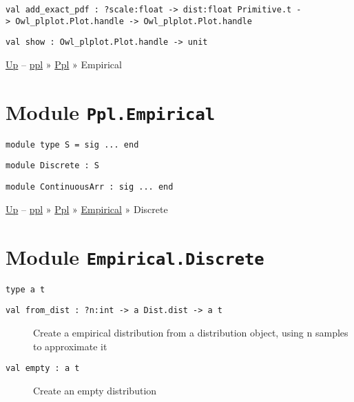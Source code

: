 \protect\hyperlink{val-addux5fexactux5fpdf}{}\texttt{val\ add\_exact\_pdf\ :\ ?⁠scale:float\ -\textgreater{}\ dist:float\ Primitive.t\ -\textgreater{}\ Owl\_plplot.Plot.handle\ -\textgreater{}\ Owl\_plplot.Plot.handle}

\protect\hyperlink{val-show}{}\texttt{val\ show\ :\ Owl\_plplot.Plot.handle\ -\textgreater{}\ unit}

\href{../index.html}{Up} -- \href{../../index.html}{ppl} »
\href{../index.html}{Ppl} » Empirical

\section{\texorpdfstring{Module
\texttt{Ppl.Empirical}}{Module Ppl.Empirical}}\label{module-ppl.empirical}

\hypertarget{module-type-S}{}
\protect\hyperlink{module-type-S}{}\texttt{module\ type\ S\ =\ sig\ ...\ end}

\hypertarget{module-Discrete}{}
\protect\hyperlink{module-Discrete}{}\texttt{module\ Discrete\ :\ S}

\hypertarget{module-ContinuousArr}{}
\protect\hyperlink{module-ContinuousArr}{}\texttt{module\ ContinuousArr\ :\ sig\ ...\ end}

\href{../index.html}{Up} -- \href{../../../index.html}{ppl} »
\href{../../index.html}{Ppl} » \href{../index.html}{Empirical} »
Discrete

\section{\texorpdfstring{Module
\texttt{Empirical.Discrete}}{Module Empirical.Discrete}}\label{module-empirical.discrete}

\protect\hyperlink{type-t}{}\texttt{type\ \textquotesingle{}a\ t}

\begin{description}
\item[{\protect\hyperlink{val-fromux5fdist}{}\texttt{val\ from\_dist\ :\ ?⁠n:int\ -\textgreater{}\ \textquotesingle{}a\ Dist.dist\ -\textgreater{}\ \textquotesingle{}a\ t}}]
Create a empirical distribution from a distribution object, using n
samples to approximate it
\end{description}

\begin{description}
\item[{\protect\hyperlink{val-empty}{}\texttt{val\ empty\ :\ \textquotesingle{}a\ t}}]
Create an empty distribution
\end{description}

